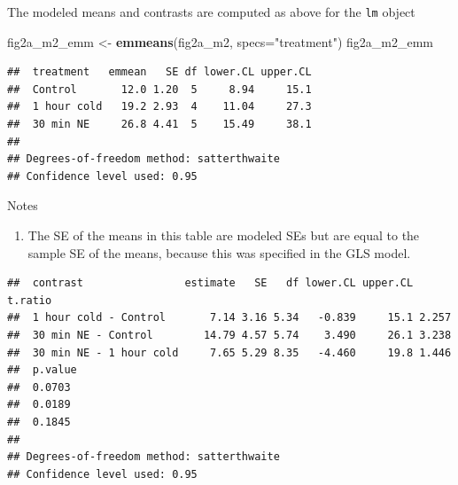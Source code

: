 \documentclass[]{book}
\newenvironment{Shaded}{\begin{snugshade}}{\end{snugshade}}
\newcommand{\DataTypeTok}[1]{\textcolor[rgb]{0.13,0.29,0.53}{#1}}
\newcommand{\KeywordTok}[1]{\textcolor[rgb]{0.13,0.29,0.53}{\textbf{#1}}}
\newcommand{\NormalTok}[1]{#1}
\newcommand{\OperatorTok}[1]{\textcolor[rgb]{0.81,0.36,0.00}{\textbf{#1}}}
\newcommand{\OtherTok}[1]{\textcolor[rgb]{0.56,0.35,0.01}{#1}}
\newcommand{\StringTok}[1]{\textcolor[rgb]{0.31,0.60,0.02}{#1}}
\providecommand{\tightlist}{%
  \setlength{\itemsep}{0pt}\setlength{\parskip}{0pt}}
\begin{document}
The modeled means and contrasts are computed as above for the \texttt{lm} object

\begin{Shaded}
\begin{Highlighting}[]
\NormalTok{fig2a_m2_emm <-}\StringTok{ }\KeywordTok{emmeans}\NormalTok{(fig2a_m2, }\DataTypeTok{specs=}\StringTok{"treatment"}\NormalTok{)}
\NormalTok{fig2a_m2_emm}
\end{Highlighting}
\end{Shaded}

\begin{verbatim}
##  treatment   emmean   SE df lower.CL upper.CL
##  Control       12.0 1.20  5     8.94     15.1
##  1 hour cold   19.2 2.93  4    11.04     27.3
##  30 min NE     26.8 4.41  5    15.49     38.1
## 
## Degrees-of-freedom method: satterthwaite 
## Confidence level used: 0.95
\end{verbatim}

Notes

\begin{enumerate}
\def\labelenumi{\arabic{enumi}.}
\tightlist
\item
  The SE of the means in this table are modeled SEs but are equal to the sample SE of the means, because this was specified in the GLS model.
\end{enumerate}

\begin{Shaded}
\end{Shaded}

\begin{verbatim}
##  contrast                estimate   SE   df lower.CL upper.CL t.ratio
##  1 hour cold - Control       7.14 3.16 5.34   -0.839     15.1 2.257  
##  30 min NE - Control        14.79 4.57 5.74    3.490     26.1 3.238  
##  30 min NE - 1 hour cold     7.65 5.29 8.35   -4.460     19.8 1.446  
##  p.value
##  0.0703 
##  0.0189 
##  0.1845 
## 
## Degrees-of-freedom method: satterthwaite 
## Confidence level used: 0.95
\end{verbatim}
\end{document}
